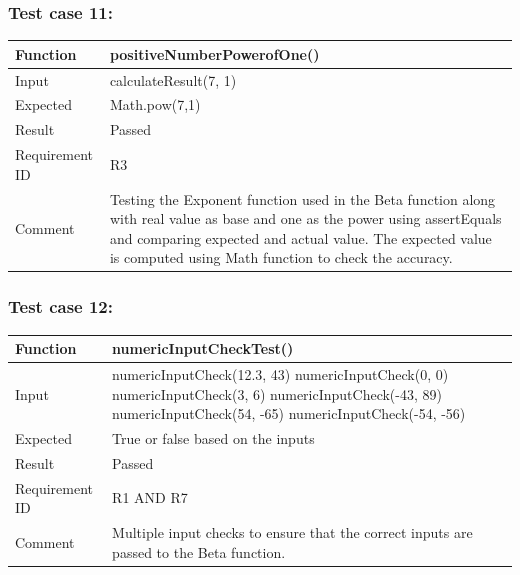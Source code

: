 \documentclass[letterpaper, 11pt]{article}
\begin{document}
        \subsubsection{\textbf{Test case 11:}} 
            \setlength{\tabcolsep}{25pt}
            \renewcommand{\arraystretch}{1.5}
            \begin{tabularx}{1.0\textwidth} { 
                  | >{\raggedright\arraybackslash}X 
                  | >{\raggedright\arraybackslash}X | }
                 \hline
                 Function & positiveNumberPowerofOne()\\
                 \hline
                 Input  & calculateResult(7, 1)\\
                  \hline
                 Expected  & Math.pow(7,1)\\
                  \hline
                 Result  & Passed\\
                  \hline
                 Requirement ID  & R3\\
                    \hline
                 Comment  & Testing the Exponent function used in the Beta function along with real  value as base and one as the power using assertEquals and comparing expected and actual value. The expected value is computed using Math function to check the accuracy.\\
                \hline
            \end{tabularx} 

        \subsubsection{\textbf{Test case 12:}} 
            \setlength{\tabcolsep}{25pt}
            \renewcommand{\arraystretch}{1.5}
            \begin{tabularx}{1.0\textwidth} { 
                  | >{\raggedright\arraybackslash}X 
                  | >{\raggedright\arraybackslash}X | }
                 \hline
                 Function & numericInputCheckTest()\\
                 \hline
                 Input  & numericInputCheck(12.3, 43)
                 numericInputCheck(0, 0)
                 numericInputCheck(3, 6)
                 numericInputCheck(-43, 89)
                 numericInputCheck(54, -65)
                 numericInputCheck(-54, -56)\\
                  \hline
                 Expected  & True or false based on the inputs\\
                  \hline
                 Result  & Passed\\
                  \hline
                 Requirement ID  & R1 AND R7\\
                    \hline
                 Comment  & Multiple input checks to ensure that the correct inputs are passed to the Beta function.\\
                \hline
            \end{tabularx} 
    \newpage
\end{document}
